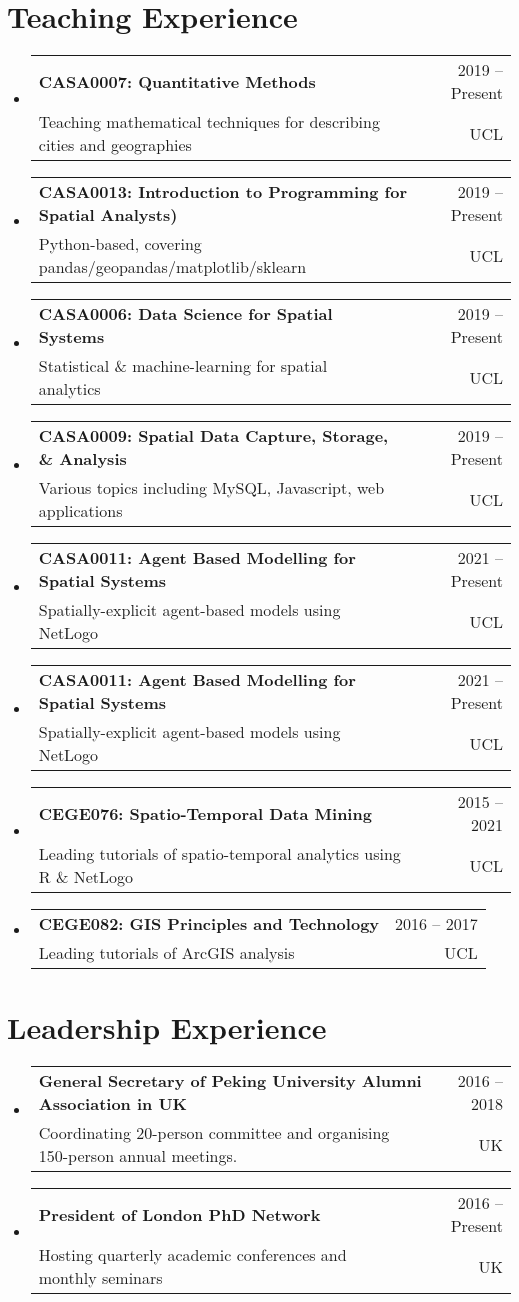 \documentclass[A4,11pt]{article}
\makeatletter
\newcommand{\CVSubheading}[4]{
  \vspace{-2pt}\item
    \begin{tabular*}{0.97\textwidth}[t]{l@{\extracolsep{\fill}}r}
      \textbf{#1} & #2 \\
      \small#3 & \small #4 \\
    \end{tabular*}\vspace{-7pt}
}
\newcommand{\CVSubHeadingListStart}{\begin{itemize}[leftmargin=0.5cm, label={}]}
\newcommand{\CVSubHeadingListEnd}{\end{itemize}}
\makeatother
\begin{document}
\section{Teaching Experience}
  \CVSubHeadingListStart
    \CVSubheading
      {CASA0007: Quantitative Methods}{2019 -- Present}
      {Teaching mathematical techniques for describing cities and geographies}{UCL}
    \CVSubheading
      {CASA0013: Introduction to Programming for Spatial Analysts)}{2019 -- Present}
      {Python-based, covering pandas/geopandas/matplotlib/sklearn}{UCL}
    \CVSubheading
      {CASA0006: Data Science for Spatial Systems}{2019 -- Present}
      {Statistical \& machine-learning for spatial analytics}{UCL}
    \CVSubheading
      {CASA0009: Spatial Data Capture, Storage, \& Analysis}{2019 -- Present}
      {Various topics including MySQL, Javascript, web applications}{UCL}
    \CVSubheading
      {CASA0011: Agent Based Modelling for Spatial Systems}{2021 -- Present}
      {Spatially-explicit agent-based models using NetLogo}{UCL}
    \CVSubheading
      {CASA0011: Agent Based Modelling for Spatial Systems}{2021 -- Present}
      {Spatially-explicit agent-based models using NetLogo}{UCL}
    \CVSubheading
      {CEGE076: Spatio-Temporal Data Mining}{2015 -- 2021}
      {Leading tutorials of spatio-temporal analytics using R \& NetLogo}{UCL}
    \CVSubheading
      {CEGE082: GIS Principles and Technology}{2016 -- 2017}
      {Leading tutorials of ArcGIS analysis}{UCL}
  \CVSubHeadingListEnd

\section{Leadership Experience}
  \CVSubHeadingListStart
    \CVSubheading
      {General Secretary of Peking University Alumni Association in UK}{2016 -- 2018}
      {Coordinating 20-person committee and organising 150-person annual meetings.}{UK}
    \CVSubheading
      {President of London PhD Network}{2016 -- Present}
      {Hosting quarterly academic conferences and monthly seminars}{UK}
  \CVSubHeadingListEnd

\begin{comment}
This section is compressed from the various skills sections that Euro CV
recommends.
\end{comment}
\end{document}
